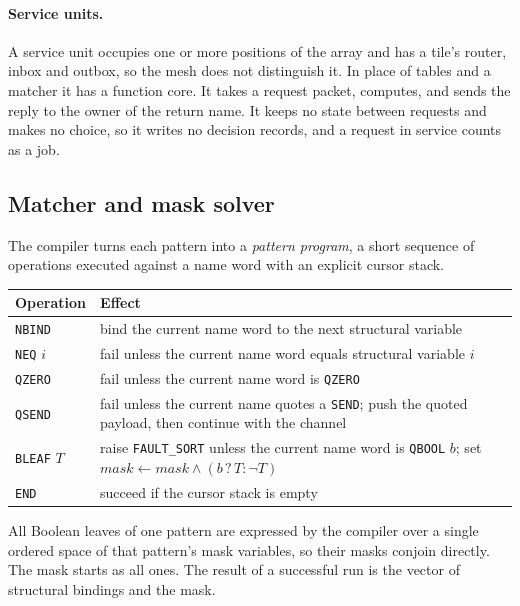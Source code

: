 \documentclass[11pt]{article}
\newcommand{\kw}[1]{\texttt{#1}}
\theoremstyle{definition}
\theoremstyle{remark}
\begin{document}
\paragraph{Service units.} A service unit occupies one or more positions of
the array and has a tile's router, inbox and outbox, so the mesh does not
distinguish it. In place of tables and a matcher it has a function core. It
takes a request packet, computes, and sends the reply to the owner of the
return name. It keeps no state between requests and makes no choice, so it
writes no decision records, and a request in service counts as a job.

\subsection{Matcher and mask solver}\label{sec:matcher}

The compiler turns each pattern into a \emph{pattern program}, a short
sequence of operations executed against a name word with an explicit cursor
stack.

\medskip\noindent
\begin{tabularx}{\textwidth}{@{}l X@{}}
\toprule
Operation & Effect\\
\midrule
\kw{NBIND}       & bind the current name word to the next structural variable\\
\kw{NEQ} $i$     & fail unless the current name word equals structural variable $i$\\
\kw{QZERO}       & fail unless the current name word is \kw{QZERO}\\
\kw{QSEND}       & fail unless the current name quotes a \kw{SEND}; push the
                   quoted payload, then continue with the channel\\
\kw{BLEAF} $T$   & raise \kw{FAULT\_SORT} unless the current name word is \kw{QBOOL} $b$;
                   set $\mathit{mask} \leftarrow \mathit{mask} \wedge
                   (b \mathrel{?} T : \neg T)$\\
\kw{END}         & succeed if the cursor stack is empty\\
\bottomrule
\end{tabularx}

\medskip\noindent
All Boolean leaves of one pattern are expressed by the compiler over a single
ordered space of that pattern's mask variables, so their masks conjoin
directly. The mask starts as all ones. The result of a successful run is the
vector of structural bindings and the mask.
\end{document}
